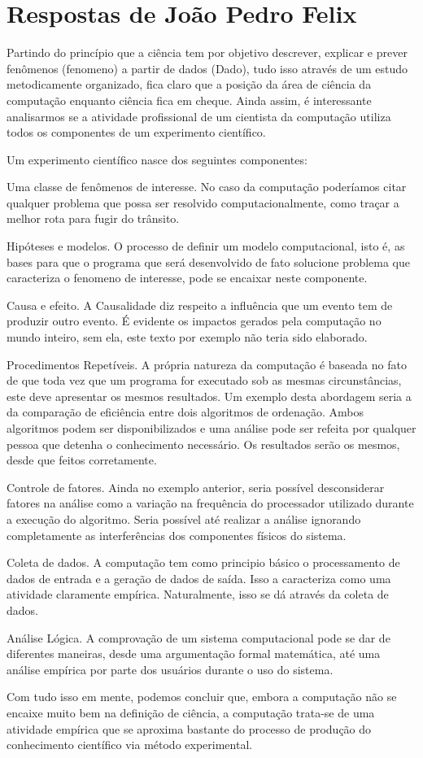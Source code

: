 \section{Respostas de João Pedro Felix}

Partindo do princípio que a ciência tem por objetivo descrever, explicar e prever fenômenos (\gls{fenomeno}) a partir de dados (\gls{Dado}), tudo isso através de um estudo metodicamente organizado, fica claro que a posição da área de ciência da computação enquanto ciência fica em cheque. Ainda assim, é interessante analisarmos se a atividade profissional de um cientista da computação utiliza todos os componentes de um experimento científico.

Um experimento científico nasce dos seguintes componentes:

Uma classe de fenômenos de interesse. No caso da computação poderíamos citar qualquer problema que possa ser resolvido computacionalmente, como traçar a melhor rota para fugir do trânsito.

Hipóteses e modelos. O processo de definir um modelo computacional, isto é, as bases para que o programa que será desenvolvido de fato solucione problema que caracteriza o \gls{fenomeno} de interesse, pode se encaixar neste componente.

Causa e efeito. A \gls{Causalidade} diz respeito a influência que um evento tem de produzir outro evento. É evidente os impactos gerados pela computação no mundo inteiro, sem ela, este texto por exemplo não teria sido elaborado.

Procedimentos Repetíveis. A própria natureza da computação é baseada no fato de que toda vez que um programa for executado sob as mesmas circunstâncias, este deve apresentar os mesmos resultados. Um exemplo desta abordagem seria a da comparação de eficiência entre dois algoritmos de ordenação. Ambos algoritmos podem ser disponibilizados e uma análise pode ser refeita por qualquer pessoa que detenha o conhecimento necessário. Os resultados serão os mesmos, desde que feitos corretamente.

Controle de fatores. Ainda no exemplo anterior, seria possível desconsiderar fatores na análise como a variação na frequência do processador utilizado durante a execução do algoritmo. Seria possível até realizar a análise ignorando completamente as interferências dos componentes físicos do sistema.

Coleta de dados. A computação tem como principio básico o processamento de dados de entrada e a geração de dados de saída. Isso a caracteriza como uma atividade claramente empírica. Naturalmente, isso se dá através da coleta de dados.

Análise Lógica. A comprovação de um sistema computacional pode se dar de diferentes maneiras, desde uma argumentação formal matemática, até uma análise empírica por parte dos usuários durante o uso do sistema.

Com tudo isso em mente, podemos concluir que, embora a computação não se encaixe muito bem na definição de ciência, a computação trata-se de uma atividade empírica que se aproxima bastante do processo de produção do conhecimento científico via método experimental.